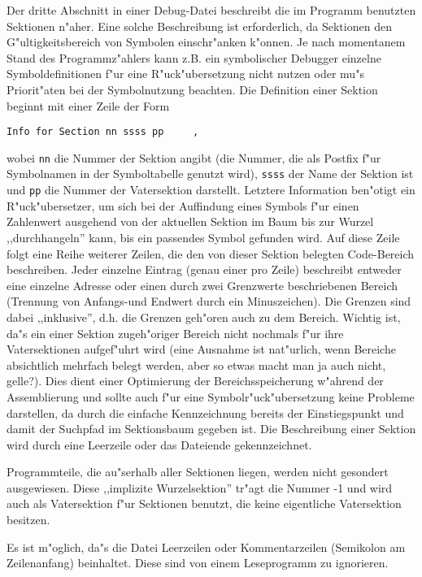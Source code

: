 \documentclass[12pt,a4paper,twoside]{report}
\newcommand{\tty}[1]{{\tt #1}}
\begin{document}
Der dritte Abschnitt in einer Debug-Datei beschreibt die im Programm
benutzten Sektionen n"aher.  Eine solche Beschreibung ist erforderlich,
da Sektionen den G"ultigkeitsbereich von Symbolen einschr"anken
k"onnen.  Je nach momentanem Stand des Programmz"ahlers kann z.B. ein
symbolischer Debugger einzelne Symboldefinitionen f"ur eine R"uck"ubersetzung
nicht nutzen oder mu"s Priorit"aten bei der Symbolnutzung beachten.
Die Definition einer Sektion beginnt mit einer Zeile der Form
\begin{verbatim}
Info for Section nn ssss pp     ,
\end{verbatim}
wobei \tty{nn} die Nummer der Sektion angibt (die Nummer, die als Postfix
f"ur Symbolnamen in der Symboltabelle genutzt wird), \tty{ssss} der Name der
Sektion ist und \tty{pp} die Nummer der Vatersektion darstellt.  Letztere
Information ben"otigt ein R"uck"ubersetzer, um sich bei der Auffindung
eines Symbols f"ur einen Zahlenwert ausgehend von der aktuellen Sektion
im Baum bis zur Wurzel ,,durchhangeln'' kann, bis ein passendes
Symbol gefunden wird.  Auf diese Zeile folgt eine Reihe weiterer
Zeilen, die den von dieser Sektion belegten Code-Bereich beschreiben.
Jeder einzelne Eintrag (genau einer pro Zeile) beschreibt entweder
eine einzelne Adresse oder einen durch zwei Grenzwerte beschriebenen
Bereich (Trennung von Anfangs-und Endwert durch ein Minuszeichen).
Die Grenzen sind dabei ,,inklusive'', d.h. die Grenzen geh"oren auch zu
dem Bereich.  Wichtig ist, da"s ein einer Sektion zugeh"origer Bereich
nicht nochmals f"ur ihre Vatersektionen aufgef"uhrt wird (eine Ausnahme
ist nat"urlich, wenn Bereiche absichtlich mehrfach belegt werden, aber
so etwas macht man ja auch nicht, gelle?).  Dies dient einer Optimierung
der Bereichsspeicherung w"ahrend der Assemblierung und sollte auch
f"ur eine Symbolr"uck"ubersetzung keine Probleme darstellen, da durch
die einfache Kennzeichnung bereits der Einstiegspunkt und damit der
Suchpfad im Sektionsbaum gegeben ist.  Die Beschreibung einer Sektion
wird durch eine Leerzeile oder das Dateiende gekennzeichnet.

Programmteile, die au"serhalb aller Sektionen liegen, werden nicht
gesondert ausgewiesen.  Diese ,,implizite Wurzelsektion'' tr"agt die
Nummer -1 und wird auch als Vatersektion f"ur Sektionen benutzt, die
keine eigentliche Vatersektion besitzen.

Es ist m"oglich, da"s die Datei Leerzeilen oder Kommentarzeilen
(Semikolon am Zeilenanfang) beinhaltet.  Diese sind von einem
Leseprogramm zu ignorieren.
\end{document}
